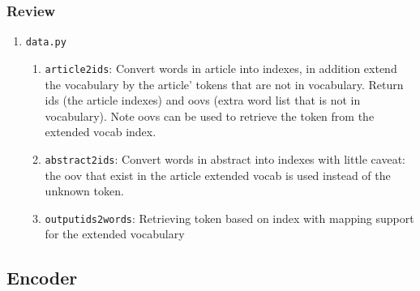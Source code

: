 \documentclass{article}
\begin{document}
  \subsubsection{Review}
  \begin{enumerate}
    \item \texttt{data.py}
    \begin{enumerate}
      \item \texttt{article2ids}: Convert words in article into indexes, in addition extend the vocabulary by the article' tokens that are not in vocabulary. Return ids (the article indexes) and oovs (extra word list that is not in vocabulary). Note oovs can be used to retrieve the token from the extended vocab index.
      \item \texttt{abstract2ids}: Convert words in abstract into indexes with little caveat: the oov that exist in the article extended vocab is used instead of the unknown token.
      \item \texttt{outputids2words}: Retrieving token based on index with mapping support for the extended vocabulary
    \end{enumerate}
  \end{enumerate}
  \subsection{Encoder}
\end{document}
